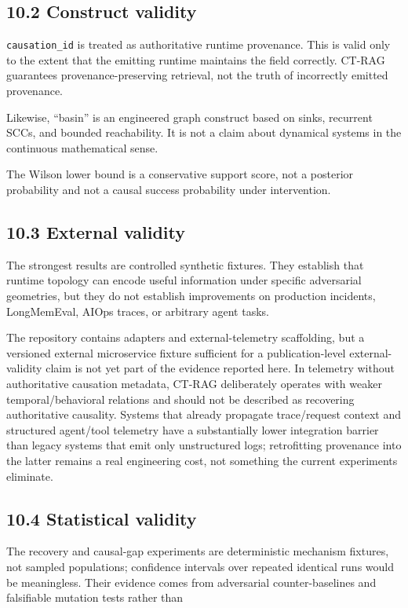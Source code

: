 \documentclass[
  11pt,
]{article}
\begin{document}
\subsection{10.2 Construct validity}\label{construct-validity}

\texttt{causation\_id} is treated as authoritative runtime provenance.
This is valid only to the extent that the emitting runtime maintains the
field correctly. CT-RAG guarantees provenance-preserving retrieval, not
the truth of incorrectly emitted provenance.

Likewise, ``basin'' is an engineered graph construct based on sinks,
recurrent SCCs, and bounded reachability. It is not a claim about
dynamical systems in the continuous mathematical sense.

The Wilson lower bound is a conservative support score, not a posterior
probability and not a causal success probability under intervention.

\subsection{10.3 External validity}\label{external-validity}

The strongest results are controlled synthetic fixtures. They establish
that runtime topology can encode useful information under specific
adversarial geometries, but they do not establish improvements on
production incidents, LongMemEval, AIOps traces, or arbitrary agent
tasks.

The repository contains adapters and external-telemetry scaffolding, but
a versioned external microservice fixture sufficient for a
publication-level external-validity claim is not yet part of the
evidence reported here. In telemetry without authoritative causation
metadata, CT-RAG deliberately operates with weaker temporal/behavioral
relations and should not be described as recovering authoritative
causality. Systems that already propagate trace/request context and
structured agent/tool telemetry have a substantially lower integration
barrier than legacy systems that emit only unstructured logs;
retrofitting provenance into the latter remains a real engineering cost,
not something the current experiments eliminate.

\subsection{10.4 Statistical validity}\label{statistical-validity}

The recovery and causal-gap experiments are deterministic mechanism
fixtures, not sampled populations; confidence intervals over repeated
identical runs would be meaningless. Their evidence comes from
adversarial counter-baselines and falsifiable mutation tests rather than
\end{document}
